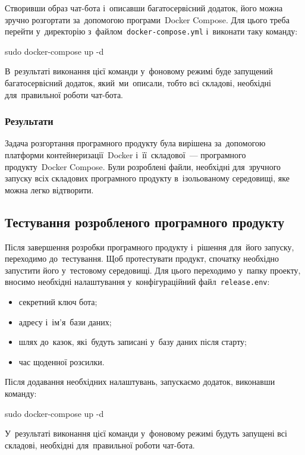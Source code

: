 \documentclass[
	a4paper,
	oneside,
	BCOR = 10mm,
	DIV = 12,
	12pt,
	headings = normal,
]{scrartcl}
\newcommand{\filename}[1]{\texttt{#1}}
\begin{document}
			Створивши образ чат-бота і~описавши багатосервісний додаток, його можна зручно розгортати за~допомогою програми~\textenglish{Docker Compose}. Для цього треба перейти у~директорію з~файлом~\filename{\textenglish{docker-compose.yml}} і~виконати таку команду:
			\begin{bashterm}
				sudo docker-compose up -d
			\end{bashterm}
			В~результаті виконання цієї команди у~фоновому режимі буде запущений багатосервісний додаток, який~ми~описали, тобто всі складові, необхідні для~правильної роботи чат-бота.

			\subsubsection{Результати}
				Задача розгортання програмного продукту була вирішена за~допомогою платформи контейнеризації~\textenglish{Docker} і~її~складової~— програмного продукту~\textenglish{Docker Compose}. Були розроблені файли, необхідні для~зручного запуску всіх складових програмного продукту в~ізольованому середовищі, яке можна легко відтворити. 

		\subsection{Тестування розробленого програмного продукту}
			Після завершення розробки програмного продукту і~рішення для~його запуску, переходимо до~тестування. Щоб протестувати продукт, спочатку необхідно запустити його у~тестовому середовищі. Для цього переходимо у~папку проекту, вносимо необхідні налаштування у~конфігураційний файл~\filename{\textenglish{release.env}}:
			\begin{itemize}
				\item секретний ключ бота;
				\item адресу і~ім'я~бази даних;
				\item шлях до~казок, які~будуть записані у~базу даних після старту;
				\item час щоденної розсилки.
			\end{itemize}
					
			Після додавання необхідних налаштувань, запускаємо додаток, виконавши команду:
			\begin{bashterm}
				sudo docker-compose up -d
			\end{bashterm}
			У~результаті виконання цієї команди у~фоновому режимі будуть запущені всі складові, необхідні для~правильної роботи чат-бота.
\end{document}
